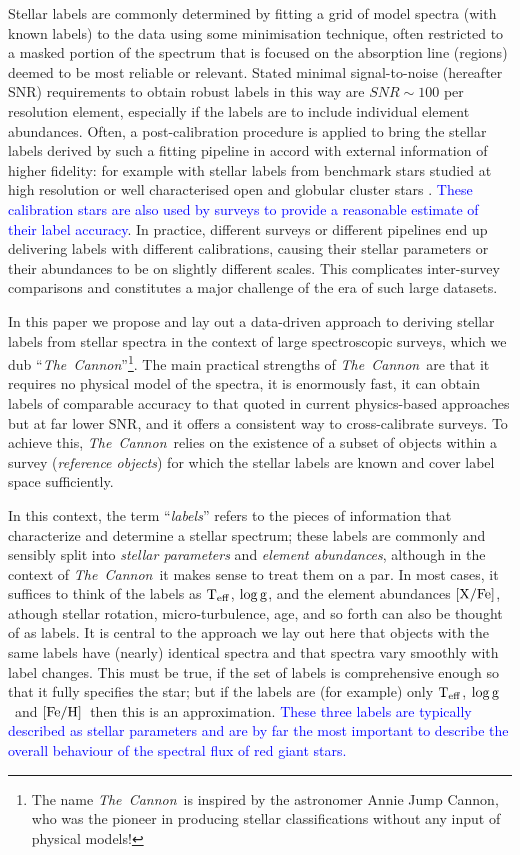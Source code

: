 \documentclass[12pt, preprint]{aastex}
\newcommand{\tc}{\textsl{The~Cannon}}
\newcommand{\teff}{\mbox{$\rm T_{eff}$}}
\newcommand{\feh}{\mbox{$\rm [Fe/H]$}}
\newcommand{\xfe}{\mbox{$\rm [X/Fe]$}}
\newcommand{\logg}{\mbox{$\rm \log g$}}
\begin{document}
Stellar labels are commonly determined by fitting a grid of model spectra (with known labels) to the data using some minimisation technique, often restricted to a masked portion of the spectrum that is focused on the absorption line (regions) deemed to be most reliable or relevant. 
Stated minimal signal-to-noise (hereafter SNR) requirements to obtain robust labels in this way are $SNR\sim 100$ per resolution element, especially if the labels are to include individual element abundances. 
Often, a post-calibration procedure is applied to bring the stellar labels derived by such a fitting pipeline in accord with external information of higher fidelity: for example with stellar labels from benchmark stars studied at high resolution or well characterised open and globular cluster stars \citep[e.g.,][]{Meszaros2013, Kord2013, Jofre2014}. \textcolor{blue}{These calibration stars are also used by surveys to provide a reasonable estimate of their label accuracy}. 
In practice, different surveys or different pipelines end up delivering labels with different calibrations,
causing their stellar parameters or their abundances to be on slightly different scales.
This complicates inter-survey comparisons and constitutes a major challenge of the era of such large datasets. 

In this paper we propose and lay out a data-driven approach to deriving stellar labels from stellar spectra in the context of large spectroscopic surveys,
which we dub ``\tc''\footnote{The name \tc\ is inspired by the astronomer Annie Jump Cannon,
who was the pioneer in producing stellar classifications without any input of physical models!}.
The main practical strengths of \tc\ are that it requires no physical model of the spectra, it is enormously fast, it can obtain labels of comparable accuracy to that quoted in current physics-based approaches
 but at far lower SNR, and it offers a consistent way to cross-calibrate surveys. 
To achieve this, \tc\ relies on the existence of a subset of objects within a survey
(\textit{reference objects}) for which the stellar labels are known and cover label space sufficiently.

In this context, the term ``\emph{labels}'' refers to the pieces of information
that characterize and determine a stellar spectrum; these labels are commonly and sensibly split into \emph{stellar parameters} and \emph{element abundances}, although in the context of \tc\ it makes sense to treat them on a par. 
In most cases, it suffices to think of the labels as \teff , \logg, and the element abundances \xfe, athough stellar rotation, micro-turbulence, age, and so forth can also be thought of as labels.
It is central to the approach we lay out here that objects with the same labels have (nearly) identical spectra and that spectra vary smoothly with label changes. 
This must be true, if the set of labels is comprehensive enough so that it fully specifies the star; but if the labels are (for example) only \teff, \logg\ and \feh\ then this is an approximation. 
\textcolor{blue}{These three labels are typically described as stellar parameters and are by far the most important to describe the overall behaviour of the spectral flux of red giant stars.} 
\end{document}
